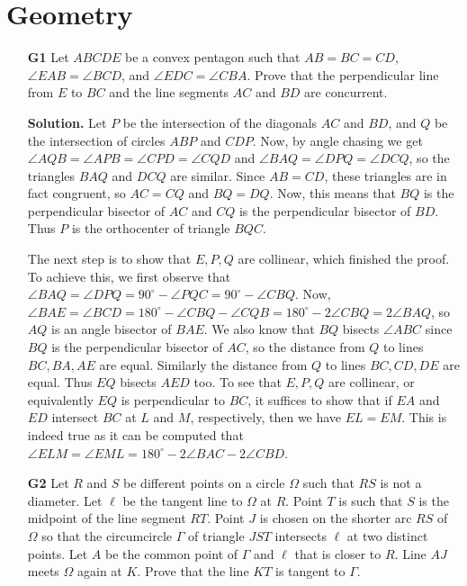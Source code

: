 \documentclass[11pt,a4paper]{article}
\begin{document}
\section{Geometry}
\begin{enumerate}
	\item[\textbf{G1}] Let $ABCDE$ be a convex pentagon such that $AB=BC=CD$, $\angle{EAB}=\angle{BCD}$, and $\angle{EDC}=\angle{CBA}$. Prove that the perpendicular line from $E$ to $BC$ and the line segments $AC$ and $BD$ are concurrent.
	
	\textbf{Solution.} Let $P$ be the intersection of the diagonals $AC$ and $BD$, and $Q$ be the intersection of circles $ABP$ and $CDP$. Now, by angle chasing we get $\angle AQB=\angle APB=\angle CPD=\angle CQD$ and $\angle BAQ=\angle DPQ=\angle DCQ$, so the triangles $BAQ$ and $DCQ$ are similar. Since $AB=CD$, these triangles are in fact congruent, so $AC=CQ$ and $BQ=DQ$. Now, this means that $BQ$ is the perpendicular bisector of $AC$ and $CQ$ is the perpendicular bisector of $BD$. Thus $P$ is the orthocenter of triangle $BQC$. 
	
	The next step is to show that $E, P, Q$ are collinear, which finished the proof. To achieve this, we first observe that $\angle BAQ=\angle DPQ= 90^{\circ}-\angle PQC=90^{\circ} - \angle CBQ$. Now, $\angle BAE=\angle BCD=180^{\circ} - \angle CBQ - \angle CQB = 180^{\circ} - 2\angle CBQ=2\angle BAQ$, so $AQ$ is an angle bisector of $BAE$. We also know that $BQ$ bisects $\angle ABC$ since $BQ$ is the perpendicular bisector of $AC$, so the distance from $Q$ to lines $BC, BA, AE$ are equal. Similarly the distance from $Q$ to lines $BC, CD, DE$ are equal. Thus $EQ$ bisects $AED$ too. To see that $E, P, Q$ are collinear, or equivalently $EQ$ is perpendicular to $BC$, it suffices to show that if $EA$ and $ED$ intersect $BC$ at $L$ and $M$, respectively, then we have $EL=EM$. This is indeed true as it can be computed that $\angle ELM=\angle EML=180^{\circ} - 2\angle BAC- 2\angle CBD$. 
	
	\item[\textbf{G2}] Let $R$ and $S$ be different points on a circle $\Omega$ such that $RS$ is not a diameter. Let $\ell$ be the tangent line to $\Omega$ at $R$. Point $T$ is such that $S$ is the midpoint of the line segment $RT$. Point $J$ is chosen on the shorter arc $RS$ of $\Omega$ so that the circumcircle $\Gamma$ of triangle $JST$ intersects $\ell$ at two distinct points. Let $A$ be the common point of $\Gamma$ and $\ell$ that is closer to $R$. Line $AJ$ meets $\Omega$ again at $K$. Prove that the line $KT$ is tangent to $\Gamma$.
	

\end{enumerate}
\end{document}
